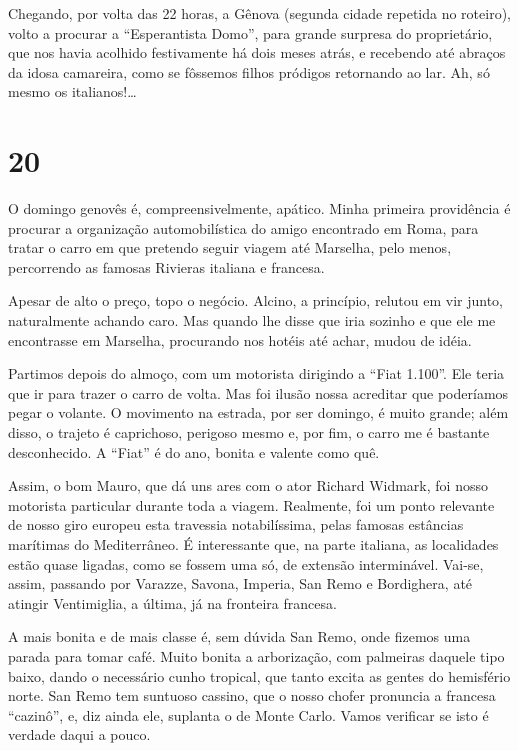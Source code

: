 Chegando, por volta das 22 horas, a Gênova (segunda cidade repetida no roteiro), volto a procurar a ``Esperantista Domo'', para grande surpresa do proprietário, que nos havia acolhido festivamente há dois meses atrás, e recebendo até abraços da idosa camareira, como se fôssemos filhos pródigos retornando ao lar. Ah, só mesmo os italianos!\ldots

\section*{20 \adfflatleafright {}}
O domingo genovês é, compreensivelmente, apático. Minha primeira providência é procurar a organização automobilística do amigo encontrado em Roma, para tratar o carro em que pretendo seguir viagem até Marselha, pelo menos, percorrendo as famosas Rivieras italiana e francesa.

Apesar de alto o preço, topo o negócio. Alcino, a princípio, relutou em vir junto, naturalmente achando caro. Mas quando lhe disse que iria sozinho e que ele me encontrasse em Marselha, procurando nos hotéis até achar, mudou de idéia.

Partimos depois do almoço, com um motorista dirigindo a ``Fiat 1.100''. Ele teria que ir para trazer o carro de volta. Mas foi ilusão nossa acreditar que poderíamos pegar o volante. O movimento na estrada, por ser domingo, é muito grande; além disso, o trajeto é caprichoso, perigoso mesmo e, por fim, o carro me é bastante desconhecido. A ``Fiat'' é do ano, bonita e valente como quê.

Assim, o bom Mauro, que dá uns ares com o ator Richard Widmark, foi nosso motorista particular durante toda a viagem. Realmente, foi um ponto relevante de nosso giro europeu esta travessia notabilíssima, pelas famosas estâncias marítimas do Mediterrâneo. É interessante que, na parte italiana, as localidades estão quase ligadas, como se fossem uma só, de extensão interminável. Vai-se, assim, passando por Varazze, Savona, Imperia, San Remo e Bordighera, até atingir Ventimiglia, a última, já na fronteira francesa.

A mais bonita e de mais classe é, sem dúvida San Remo, onde fizemos uma parada para tomar café. Muito bonita a arborização, com palmeiras daquele tipo baixo, dando o necessário cunho tropical, que tanto excita as gentes do hemisfério norte. San Remo tem suntuoso cassino, que o nosso chofer pronuncia a francesa ``cazinô'', e, diz ainda ele, suplanta o de Monte Carlo. Vamos verificar se isto é verdade daqui a pouco.

